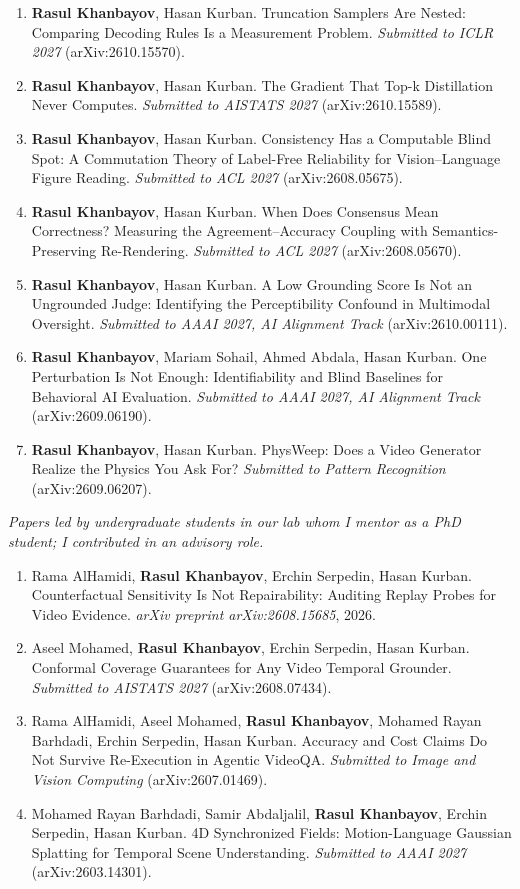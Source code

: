 \documentclass[11pt]{article}
\newcommand{\me}{\textbf{Rasul Khanbayov}}
\newcommand{\pubgroup}[1]{\vspace{6pt}{\small\textsc{#1}}\par}
\begin{document}
\pubgroup{Under Review}
\begin{enumerate}[resume]
  \item \me, Hasan Kurban.
    Truncation Samplers Are Nested: Comparing Decoding Rules Is a Measurement Problem.
    \textit{Submitted to ICLR 2027} (arXiv:2610.15570).
  \item \me, Hasan Kurban.
    The Gradient That Top-k Distillation Never Computes.
    \textit{Submitted to AISTATS 2027} (arXiv:2610.15589).
  \item \me, Hasan Kurban.
    Consistency Has a Computable Blind Spot: A Commutation Theory of Label-Free Reliability for Vision--Language Figure Reading.
    \textit{Submitted to ACL 2027} (arXiv:2608.05675).
  \item \me, Hasan Kurban.
    When Does Consensus Mean Correctness? Measuring the Agreement--Accuracy Coupling with Semantics-Preserving Re-Rendering.
    \textit{Submitted to ACL 2027} (arXiv:2608.05670).
  \item \me, Hasan Kurban.
    A Low Grounding Score Is Not an Ungrounded Judge: Identifying the Perceptibility Confound in Multimodal Oversight.
    \textit{Submitted to AAAI 2027, AI Alignment Track} (arXiv:2610.00111).
  \item \me, Mariam Sohail, Ahmed Abdala, Hasan Kurban.
    One Perturbation Is Not Enough: Identifiability and Blind Baselines for Behavioral AI Evaluation.
    \textit{Submitted to AAAI 2027, AI Alignment Track} (arXiv:2609.06190).
  \item \me, Hasan Kurban.
    PhysWeep: Does a Video Generator Realize the Physics You Ask For?
    \textit{Submitted to Pattern Recognition} (arXiv:2609.06207).
\end{enumerate}

\pubgroup{Mentored Student Research}
{\small\itshape Papers led by undergraduate students in our lab whom I mentor as a PhD student; I contributed in an advisory role.}\par
\begin{enumerate}[resume]
  \item Rama AlHamidi, \me, Erchin Serpedin, Hasan Kurban.
    Counterfactual Sensitivity Is Not Repairability: Auditing Replay Probes for Video Evidence.
    \textit{arXiv preprint arXiv:2608.15685}, 2026.
  \item Aseel Mohamed, \me, Erchin Serpedin, Hasan Kurban.
    Conformal Coverage Guarantees for Any Video Temporal Grounder.
    \textit{Submitted to AISTATS 2027} (arXiv:2608.07434).
  \item Rama AlHamidi, Aseel Mohamed, \me, Mohamed Rayan Barhdadi, Erchin Serpedin, Hasan Kurban.
    Accuracy and Cost Claims Do Not Survive Re-Execution in Agentic VideoQA.
    \textit{Submitted to Image and Vision Computing} (arXiv:2607.01469).
  \item Mohamed Rayan Barhdadi, Samir Abdaljalil, \me, Erchin Serpedin, Hasan Kurban.
    4D Synchronized Fields: Motion-Language Gaussian Splatting for Temporal Scene Understanding.
    \textit{Submitted to AAAI 2027} (arXiv:2603.14301).
\end{enumerate}
\end{document}
